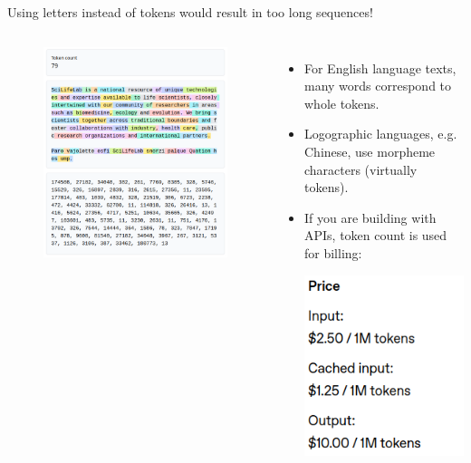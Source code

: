 \documentclass[10pt]{beamer}
\begin{document}
\begin{frame}{Using letters instead of tokens would result in too long sequences!}
	\begin{columns}[T,onlytextwidth]
		\hspace*{-0.7cm} 
		\begin{figure}
			\includegraphics[width=\textwidth]{figures/TikTokenizer.png}
		\end{figure}
		\vspace{0.7cm}
		\begin{itemize}
			\item For English language texts, many words correspond to whole tokens. 
			\item Logographic languages, e.g. Chinese, use morpheme characters (virtually tokens).
			 \item If you are building with APIs, token count is used for billing: \vspace{0.2cm} \par
			 \includegraphics[height=0.3\textheight]{figures/PricingExampleOpenAIGPt4o.png}

\end{itemize}
\end{columns}
\end{frame}
\end{document}
